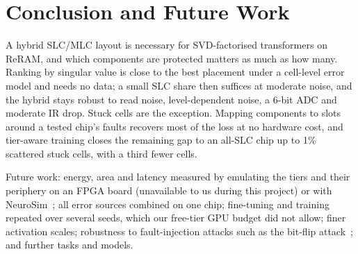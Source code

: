 \section{Conclusion and Future Work}\label{sec:conclusion}

A hybrid SLC/MLC layout is necessary for SVD-factorised transformers on ReRAM, and which components are
protected matters as much as how many. Ranking by singular value is close to the best placement under a
cell-level error model and needs no data; a small SLC share then suffices at moderate noise, and the hybrid
stays robust to read noise, level-dependent noise, a 6-bit ADC and moderate IR drop. Stuck cells are the
exception. Mapping components to slots around a tested chip's faults recovers most of the loss at no
hardware cost, and tier-aware training closes the remaining gap to an all-SLC chip up to 1\% scattered stuck
cells, with a third fewer cells.

Future work: energy, area and latency measured by emulating the tiers and their periphery on an FPGA board
(unavailable to us during this project) or with NeuroSim~\cite{peng2019neurosim}; all error sources combined
on one chip; fine-tuning and training repeated over several seeds, which our free-tier GPU budget did not
allow; finer activation scales; robustness to fault-injection attacks such as the bit-flip
attack~\cite{rakin2019bfa}; and further tasks and models.
